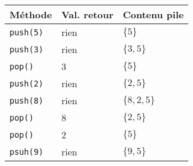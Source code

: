 \documentclass{report}
\begin{document}
\begin{multicols*}{3}
\begin{table}[H]
    \begin{center}
      \renewcommand{\arraystretch}{1.5}
      \selectfont
      \footnotesize
          \begin{tabular}{|l|l|l|}
          \arrayrulecolor{blue}\hline
          \rowcolor{lightBlue}
          \textcolor{myb}{Méthode} & 
          \textcolor{myb}{Val. retour} & \textcolor{myb}{Contenu pile}    
          \\
          \hline
          \arrayrulecolor{black}
          \texttt{push(5)} & rien & $\{ 5\}$
          \\
          \hline
          \texttt{push(3)} & rien & $\{ 3, 5\}$
          \\
          \hline
          \texttt{pop()} & 3 & $\{ 5 \}$
          \\ 
          \hline 
          \texttt{push(2)} & rien & $\{ 2, 5 \}$
          \\ 
          \hline 
          \texttt{push(8)} & rien & $\{ 8, 2, 5 \}$
          \\
          \hline 
          \texttt{pop()} & 8 & $\{ 2, 5 \}$
          \\ 
          \hline 
          \texttt{pop()} & 2 & $\{ 5 \}$
          \\ 
          \hline 
          \texttt{psuh(9)} & rien & $\{ 9, 5 \}$
         \\ 
          \hline 
          \end{tabular}
  \end{center}
  \end{table}

\end{multicols*}
\end{document}
